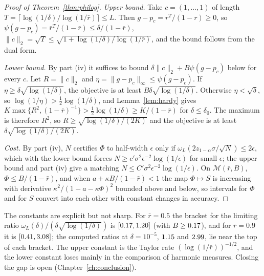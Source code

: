 \begin{proof}[Proof of Theorem~\ref{thm:philog}]
\emph{Upper bound.} Take $c=(1,\dots,1)$ of length $T=\lceil\log(1/\delta)/\log(1/\bar r)\rceil\le L$. Then $g-p_c=r^T/(1-r)\ge0$, so $\psi(g-p_c)=\bar r^T/(1-\bar r)\le\delta/(1-\bar r)$, $\|c\|_2=\sqrt T\le\sqrt{1+\log(1/\delta)/\log(1/\bar r)}$, and the bound follows from the dual form.

\emph{Lower bound.} By part (iv) it suffices to bound $\delta\|c\|_2+B\psi(g-p_c)$ below for every $c$. Let $R=\|c\|_2$ and $\eta=\|g-p_c\|_\infty\le\psi(g-p_c)$. If $\eta\ge\delta\sqrt{\log(1/\delta)}$, the objective is at least $B\delta\sqrt{\log(1/\delta)}$. Otherwise $\eta<\sqrt\delta$, so $\log(1/\eta)>\frac12\log(1/\delta)$, and Lemma~\ref{lem:hardy} gives $K\max\{R^2,(1-\bar r)^{-1}\}>\frac12\log(1/\delta)\ge K/(1-\bar r)$ for $\delta\le\delta_0$. The maximum is therefore $R^2$, so $R\ge\sqrt{\log(1/\delta)/(2K)}$ and the objective is at least $\delta\sqrt{\log(1/\delta)/(2K)}$.

\emph{Cost.} By part (iv), $N$ certifies $\Phi$ to half-width $\epsilon$ only if $\omega_L(2z_{1-\alpha}\sigma/\sqrt N)\le2\epsilon$, which with the lower bound forces $N\ge c'\sigma^2\epsilon^{-2}\log(1/\epsilon)$ for small $\epsilon$; the upper bound and part (iv) give a matching $N\le C'\sigma^2\epsilon^{-2}\log(1/\epsilon)$. On $\mathcal M(\bar r,B)$, $\Phi\le B/(1-\bar r)$, and when $a+\kappa B/(1-\bar r)<1$ the map $\Phi\mapsto S$ is increasing with derivative $\kappa^2/(1-a-\kappa\Phi)^2$ bounded above and below, so intervals for $\Phi$ and for $S$ convert into each other with constant changes in accuracy.
\end{proof}


The constants are explicit but not sharp. For $\bar r=0.5$ the bracket for the limiting ratio $\omega_L(\delta)/(\delta\sqrt{\log(1/\delta)})$ is $[0.17,1.20]$ (with $B\ge0.17$), and for $\bar r=0.9$ it is $[0.41,3.08]$; the computed ratios at $\delta=10^{-5}$, $1.15$ and $2.99$, lie near the top of each bracket. The upper constant is the Taylor rate $(\log(1/\bar r))^{-1/2}$, and the lower constant loses mainly in the comparison of harmonic measures. Closing the gap is open (Chapter~\ref{ch:conclusion}).

